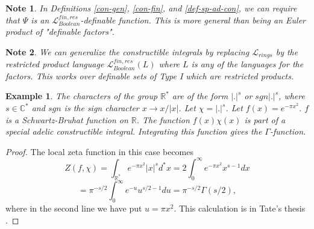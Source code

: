 \documentclass[12pt]{amsart}
\def\R{\mathbb{R}}
\def\C{\mathbb{C}}
\def\cL{\mathcal{L}}
\def\C{\mathbb{C}}
\def\R{\mathbb{R}}
\def\cL{\mathcal{L}}
\newtheorem{ex}{Example}[section]
\numberwithin{equation}{section}
\newtheorem{note}{Note}[section]
\begin{document}
\begin{note} In Definitions \ref{con-gen}, \ref{con-fin}, and \ref{def-sp-ad-con}, we can require that $\Psi$ is an $\cL_{Boolean}^{fin,res}$-definable function. This is more general than being an Euler product of "definable factors".\end{note}

\begin{note} We can generalize the constructible integrals by replacing $\cL_{rings}$ by the restricted product language $\cL_{Boolean}^{fin,res}(L)$ where $L$ is any of the languages for the factors. This works over definable sets of Type I which are restricted products.\end{note}

\begin{ex}\label{ex-gamma} The characters of the group $\R^{*}$ are of the form $|.|^s$ or $sgn |.|^s$, where $s\in \C^*$ and 
$sgn$ is the sign character $x\rightarrow x/|x|$. Let $\chi=|.|^s$. Let $f(x)=e^{-\pi x^2}$. $f$ is a Schwartz-Bruhat function on $\R$. The function $f(x)\chi(x)$ is part of a 
special adelic constructible integral. Integrating this function gives the $\Gamma$-function.\end{ex}
\begin{proof} The local zeta function in this case becomes 
$$Z(f,\chi)=\int_{\R^*} e^{-\pi x^2} |x|^s d^*x=2\int_{0}^{\infty} e^{-\pi x^2}x^{s-1} dx$$
$$=\pi^{-s/2}\int_{0}^{\infty} e^{-u}u^{s/2-1}du=\pi^{-s/2}\Gamma(s/2),$$
where in the second line we have put $u=\pi x^2$. This calculation is in Tate's thesis \cite{tate-thesis}.
\end{proof}
\end{document}
